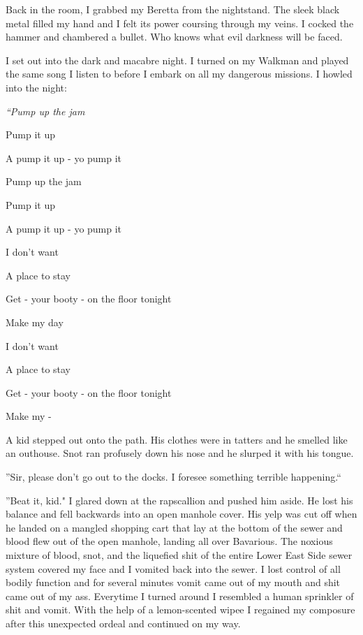 Back in the room, I grabbed my Beretta from the nightstand. The
sleek black metal filled my hand and I felt its power coursing
through my veins. I cocked the hammer and chambered a bullet. Who
knows what evil darkness will be faced.



I set out into the dark and macabre night. I turned on my Walkman
and played the same song I listen to before I embark on all my
dangerous missions. I howled into the night:



{\em ``Pump up the jam

Pump it up

A pump it up - yo pump it



Pump up the jam

Pump it up

A pump it up - yo pump it



I don't want

A place to stay

Get - your booty - on the floor tonight

Make my day



I don't want

A place to stay

Get - your booty - on the floor tonight

Make my -}



A kid stepped out onto the path. His clothes were in tatters and he
smelled like an outhouse. Snot ran profusely down his nose and he
slurped it with his tongue.



''Sir, please don't go out to the docks. I foresee something
terrible happening.``



''Beat it, kid." I glared down at the rapscallion and pushed him
aside. He lost his balance and fell backwards into an open manhole
cover. His yelp was cut off when he landed on a mangled shopping
cart that lay at the bottom of the sewer and blood flew out of the
open manhole, landing all over Bavarious. The noxious mixture of
blood, snot, and the liquefied shit of the entire Lower East Side
sewer system covered my face and I vomited back into the sewer. I
lost control of all bodily function and for several minutes vomit
came out of my mouth and shit came out of my ass. Everytime I
turned around I resembled a human sprinkler of shit and vomit. With
the help of a lemon-scented wipee I regained my composure after
this unexpected ordeal and continued on my way.



